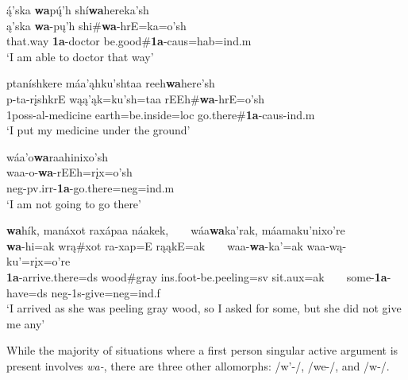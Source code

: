 \begin{exe}
\begin{xlist}
	\item \glll ą́'ska \textbf{wa}pų́'h shí\textbf{wa}hereka'sh\\
	ą'ska \textbf{wa}-pų'h shi\#\textbf{wa}-hrE=ka=o'sh\\
	\textnormal{that.way} \textbf{1a}-\textnormal{doctor} \textnormal{be.good}\#\textbf{1a}-caus=hab=ind.m\\
	\glt `I am able to doctor that way' \citep[25]{hollow1973a}
	
	\item \glll ptaníshkere máa'ąhku'shtaa reeh\textbf{wa}here'sh\\
	p-ta-rįshkrE wąą'ąk=ku'sh=taa rEEh\#\textbf{wa}-hrE=o'sh\\
	1poss-al-\textnormal{medicine} \textnormal{earth}=\textnormal{be.inside}=loc \textnormal{go.there}\#\textbf{1a}-caus-ind.m\\
	\glt `I put my medicine under the ground' \citep[48]{hollow1973a}
	
	\item \glll wáa'o\textbf{wa}raahinixo'sh\\
	waa-o-\textbf{wa}-rEEh=rįx=o'sh\\
	neg-pv.irr-\textbf{1a}-\textnormal{go.there}=neg=ind.m\\
	\glt `I am not going to go there' \citep[48]{hollow1973a}
	
		
	\item \glll \textbf{wa}hík, manáxot raxápaa náakek, ~ ~ wáa\textbf{wa}ka'rak, máamaku'nixo're\\
	\textbf{wa}-hi=ak wrą\#xot ra-xap=E rąąkE=ak ~ ~  waa-\textbf{wa}-ka'=ak waa-wą-ku'=rįx=o're\\
	\textbf{1a}-\textnormal{arrive.there}=ds \textnormal{wood}\#\textnormal{gray} ins.foot-\textnormal{be.peeling}=sv \textnormal{sit}.aux=ak ~ ~  \textnormal{some}-\textbf{1a}-\textnormal{have}=ds neg-1s-\textnormal{give}=neg=ind.f\\
	\glt `I arrived as she was peeling gray wood, so I asked for some, but she did not give me any' \citep[121]{hollow1973a}
	
	\end{xlist}

\end{exe}

While the majority of situations where a first person singular active argument is present involves \textit{wa-}, there are three other allomorphs: /w'-/, /we-/, and /w-/.


